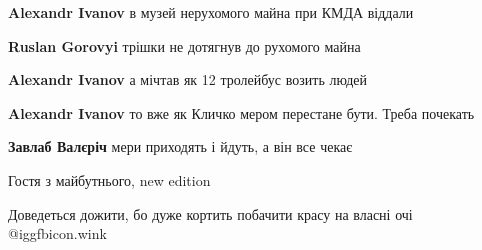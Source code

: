 \begin{itemize}
\begin{itemize}
\textbf{Alexandr Ivanov} в музей нерухомого майна при КМДА віддали

 
\textbf{Ruslan Gorovyi} трішки не дотягнув до рухомого майна

 
\textbf{Alexandr Ivanov} а мічтав як 12 тролейбус возить людей

 
\textbf{Alexandr Ivanov} то вже як Кличко мером перестане бути.
Треба почекать

 
\textbf{Завлаб Валєріч} мери приходять і йдуть, а він все чекає
\end{itemize}

 
Гостя з майбутнього, new edition

 
Доведеться дожити, бо дуже кортить побачити красу на власні очі @igg{fbicon.wink} 

 

\end{itemize}
